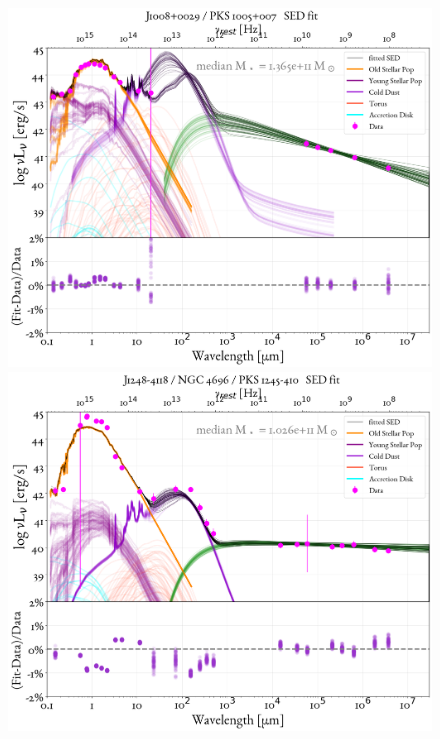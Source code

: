 \begin{figure}
    \centering
    \includegraphics[width=0.85\linewidth]{figures/ResultFits/36_SEDfit_3652.png}\\
    \includegraphics[width=0.85\linewidth]{figures/ResultFits/51_SEDfit_4126.png}   
\end{figure}
